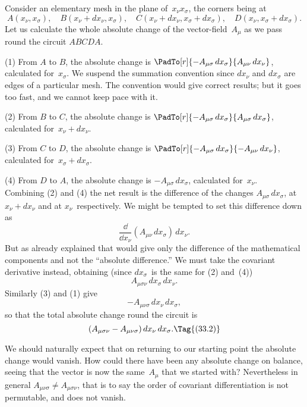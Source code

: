 \documentclass[12pt]{book}
\begin{document}
Consider an elementary mesh in the plane of~$x_{\nu} x_{\sigma}$, the corners being at
\[
A(x_{\nu}, x_{\sigma}),\quad B(x_{\nu} + dx_{\nu}, x_{\sigma}),\quad
C(x_{\nu} + dx_{\nu}, x_{\sigma} + dx_{\sigma}),\quad D(x_{\nu}, x_{\sigma} + dx_{\sigma}).
\]
Let us calculate the whole absolute change of the vector-field~$A_{\mu}$ as we pass
round the circuit $ABCDA$.

(1) From $A$ to $B$, the absolute change is $\PadTo[r]{-A_{\mu\sigma}\, dx_{\sigma}}{A_{\mu\nu}\, dx_{\nu}}$, calculated for~$x_{\sigma}$\footnotemark.\footnotetext
  {We suspend the summation convention since $dx_{\nu}$ and $dx_{\sigma}$ are edges of a particular mesh.
  The convention would give correct results; but it goes too fast, and we cannot keep pace with it.}%

(2) From $B$ to $C$, the absolute change is $\PadTo[r]{-A_{\mu\sigma}\, dx_{\sigma}}{A_{\mu\sigma}\, dx_{\sigma}}$, calculated for~$x_{\nu} + dx_{\nu}$.

(3) From $C$ to $D$, the absolute change is $\PadTo[r]{-A_{\mu\sigma}\, dx_{\sigma}}{-A_{\mu\nu}\, dx_{\nu}}$, calculated for~$x_{\sigma} + dx_{\sigma}$.

(4) From $D$ to $A$, the absolute change is $-A_{\mu\sigma}\, dx_{\sigma}$, calculated for~$x_{\nu}$. \\
Combining (2) and (4) the net result is the difference of the changes $A_{\mu\sigma}\, dx_{\sigma}$,
at $x_{\nu} + dx_{\nu}$ and at $x_{\nu}$~respectively. We might be tempted to set this difference
down as
\[
\frac{\dd}{\dd x_{\nu}} (A_{\mu\nu}\, dx_{\sigma})\, dx_{\nu}.
\]
But as already explained that would give only the difference of the mathematical
components and not the ``absolute difference.'' We must take the
covariant derivative instead, obtaining (since $dx_{\sigma}$~is the same for (2) and~(4))
\[
A_{\mu\sigma\nu}\, dx_{\sigma}\, dx_{\nu}.
\]
Similarly (3) and (1) give
\[
-A_{\mu\nu\sigma}\, dx_{\nu}\, dx_{\sigma},
\]
so that the total absolute change round the circuit is
\[
(A_{\mu\sigma\nu} - A_{\mu\nu\sigma})\, dx_{\nu}\, dx_{\sigma}.
\Tag{(33.2)}
\]

We should naturally expect that on returning to our starting point the
absolute change would vanish. How could there have been any absolute change
on balance, seeing that the vector is now the same~$A_{\mu}$ that we started with?
Nevertheless in general $A_{\mu\nu\sigma} \neq A_{\mu\sigma\nu}$, that is to say the order of covariant
differentiation is not permutable, and  does not vanish.
\end{document}
